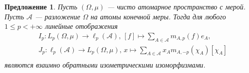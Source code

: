 \documentclass[12pt]{article}
\newtheorem{proposition}[theorem]{Предложение}
\begin{document}
\begin{proposition}\label{LpOnPurAtomMeasSpRepr}
    Пусть $(\Omega,\mu)$ --- чисто атомарное пространство с мерой. 
    Пусть $\mathcal{A}$ --- разложение $\Omega$ на атомы конечной меры. Тогда 
    для любого $1\leq p<+\infty$ линейные отображения
    \[
    \begin{aligned}
        &I_p:
        L_p(\Omega,\mu)\to \ell_p(\mathcal{A}),\,
        [f]\mapsto\sum_{A\in\mathcal{A}} m_{A,p}(f) e_A, \\
        &J_p:
        \ell_p(\mathcal{A})\to L_p(\Omega,\mu),\,
        x\mapsto\sum_{A\in\mathcal{A}} x_A m_{A,-p}(\chi_A) [\chi_A]\\
    \end{aligned}
    \]
    являются взаимно обратными изометрическими изоморфизмами.
\end{proposition}
\end{document}
